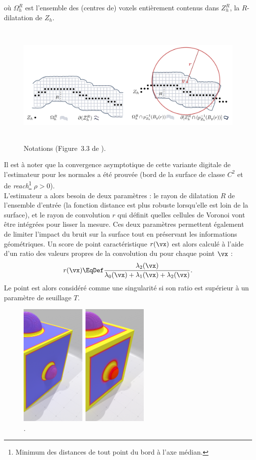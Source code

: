 %
où $\Omega_h^R$ est l'ensemble des (centres de) voxels entièrement contenus dans
$Z_h^R$, la $R$-dilatation de $Z_h$.
%
\begin{figure}[ht]{
    \begin{center}
    \includegraphics[height=6cm]{images/Feature/VCMd_notations}
    \end{center}}
    \caption[Notations.]{Notations (Figure~3.3 de \cite{Cuel2014These}).
      \label{fig:mellado-multiscale}}
\end{figure}
%
Il est à noter que la convergence asymptotique de cette variante digitale de
l'estimateur \VCM pour les normales a été prouvée (bord de la surface de classe
$C^2$ et de \emph{reach}\footnote{Minimum des distances de tout point du bord à
l'axe médian.} $\rho > 0$)\cite{Cuel2014DGCI}.
%
\\
%
L'estimateur \VCM a alors besoin de deux paramètres : le rayon de dilatation $R$
de l'ensemble d'entrée (la fonction distance est plus robuste lorsqu'elle est
loin de la surface), et le rayon de convolution $r$ qui définit quelles cellules
de Voronoi vont être intégrées pour lisser la mesure. Ces deux paramètres
permettent également de limiter l'impact du bruit sur la surface tout en
préservant les informations géométriques. Un score de point caractéristique
$r(\vx)$ est alors calculé à l'aide d'un ratio des valeurs propres de la
convolution du \VCM pour chaque point $\vx$ :
%
\begin{equation}
  r(\vx) \EqDef \frac{\lambda_2(\vx)}{\lambda_0(\vx) + \lambda_1(\vx) + \lambda_2(\vx)}.
\end{equation}
%
Le point est alors considéré comme une singularité si son ratio est supérieur à
un paramètre de seuillage $T$.
%
\begin{figure}[ht]{
  \begin{center}
    \includegraphics[height=6cm]{figures/CubeSpherePlotVCM}
  \end{center}}
    \caption[.]{.
    \label{fig:VCM-cubesphere}}
\end{figure}
